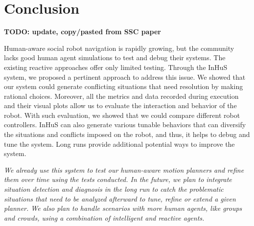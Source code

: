 \section{Conclusion}

\textbf{TODO: update, copy/pasted from SSC paper}

Human-aware social robot navigation is rapidly growing, but the community lacks good human agent simulations to test and debug their systems. The existing reactive approaches offer only limited testing. Through the InHuS system, we proposed a pertinent approach to address this issue. We showed that our system could generate conflicting situations that need resolution by making rational choices. Moreover, all the metrics and data recorded during execution and their visual plots allow us to evaluate the interaction and behavior of the robot. With such evaluation, we showed that we could compare different robot controllers. InHuS can also generate various tunable behaviors that can diversify the situations and conflicts imposed on the robot, and thus, it helps to debug and tune the system. Long runs provide additional potential ways to improve the system.  

\textit{We already use this system to test our human-aware motion planners and refine them over time using the tests conducted. In the future, we plan to integrate situation detection and diagnosis in the long run to catch the problematic situations that need to be analyzed afterward to tune, refine or extend a given planner. We also plan to handle scenarios with more human agents, like groups and crowds, using a combination of intelligent and reactive agents. }